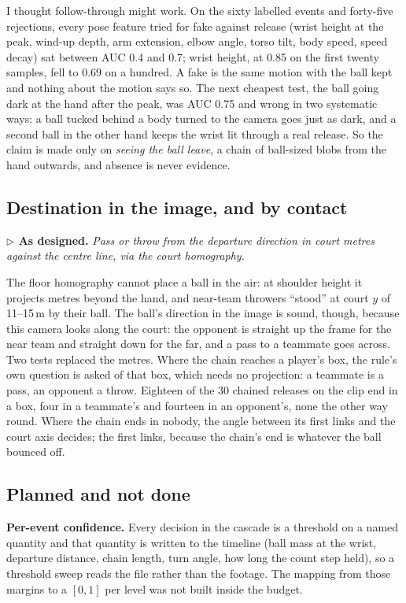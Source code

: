 \documentclass[10pt,a4paper]{article}
\newcommand{\design}[1]{%
  \par\smallskip\noindent
  {\color{accent!88!black}\small\textbf{$\triangleright$ As designed.} \textit{#1}}\par\smallskip}
\begin{document}
I thought follow-through might work. On the sixty labelled events and forty-five rejections,
every pose feature tried for fake against release (wrist height at the peak, wind-up depth,
arm extension, elbow angle, torso tilt, body speed, speed decay) sat between AUC 0.4 and
0.7; wrist height, at 0.85 on the first twenty samples, fell to 0.69 on a hundred. A fake is
the same motion with the ball kept and nothing about the motion says so. The next cheapest
test, the ball going dark at the hand after the peak, was AUC 0.75 and wrong in two
systematic ways: a ball tucked behind a body turned to the camera goes just as dark, and a
second ball in the other hand keeps the wrist lit through a real release. So the claim is
made only on \emph{seeing the ball leave}, a chain of ball-sized blobs from the hand
outwards, and absence is never evidence.

\subsection{Destination in the image, and by contact}
\label{sub:dest}

\design{Pass or throw from the departure direction in court metres against the centre
line, via the court homography.}

The floor homography cannot place a ball in the air: at shoulder height it projects metres
beyond the hand, and near-team throwers ``stood'' at court $y$ of 11--15\,m by their ball.
The ball's direction in the image is sound, though, because this camera looks along the
court: the opponent is straight up the frame for the near team and straight down for the
far, and a pass to a teammate goes across. Two tests replaced the metres. Where the chain
reaches a player's box, the rule's own question is asked of that box, which needs no
projection: a teammate is a pass, an opponent a throw. Eighteen of the 30 chained
releases on the clip end in a box, four in a teammate's and fourteen in an opponent's, none
the other way round. Where the chain ends in nobody, the angle between its first links and
the court axis decides; the first links, because the chain's end is whatever the ball
bounced off.

\subsection{Planned and not done}
\label{sub:notdone}

\textbf{Per-event confidence.} Every decision in the cascade is a threshold on a named
quantity and that quantity is written to the timeline (ball mass at the wrist, departure
distance, chain length, turn angle, how long the count step held), so a threshold sweep
reads the file rather than the footage. The mapping from those margins to a $[0,1]$ per
level was not built inside the budget.
\end{document}
